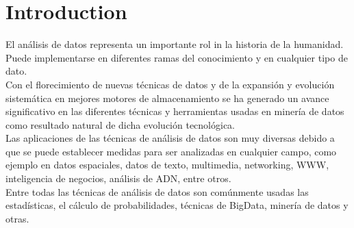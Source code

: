 \section{Introduction}
 El análisis de datos representa un importante rol in la historia de la humanidad. Puede implementarse en diferentes ramas del conocimiento y en cualquier tipo de dato.\\
 Con el florecimiento de nuevas técnicas de datos y de la expansión y evolución sistemática en mejores motores de almacenamiento se ha generado un avance significativo en las diferentes técnicas y herramientas usadas en minería de datos como resultado natural de dicha evolución tecnológica.\\
 Las aplicaciones de las técnicas de análisis de datos son muy diversas debido a que se puede establecer medidas para ser analizadas en cualquier campo, como ejemplo en datos espaciales, datos de texto, multimedia, networking, WWW, inteligencia de negocios, análisis de ADN, entre otros.\\
 Entre todas las técnicas de análisis de datos son comúnmente usadas las estadísticas, el cálculo de probabilidades, técnicas de BigData, minería de datos y otras.

